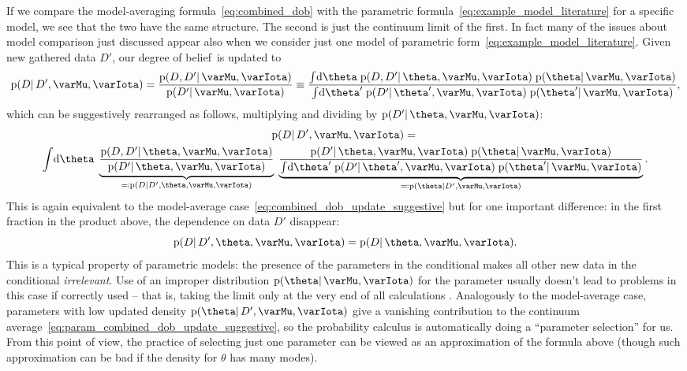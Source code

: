 \documentclass[\ifafour a4paper,12pt,\else a5paper,10pt,\fi%
onecolumn,oneside,article,%
british%
]{memoir}
\theoremstyle{remark}
\theoremstyle{innote}
\newcommand*{\citep}{\parencites}
\newcommand*{\di}{\mathrm{d}}%
\newcommand*{\defs}{\eqqcolon}
\newcommand*{\pf}{\mathrm{p}}%
\renewcommand*{\|}{\mathpunct{|}}
\newcommand*{\chap}{ch.}%
\newcommand*{\dob}{degree of belief}
\newcommand*{\yM}{\varMu}
\newcommand*{\yI}{\varIota}
\newcommand*{\yD}{D}
\newcommand*{\yHm}{\yM}
\begin{document}
If we compare the model-averaging formula~\eqref{eq:combined_dob} with the
parametric formula~\eqref{eq:example_model_literature} for a specific
model, we see that the two have the same structure. The second is just the
continuum limit of the first. In fact many of the issues about model
comparison just discussed appear also when we consider just one model of
parametric form~\eqref{eq:example_model_literature}. Given new gathered
data $\yD'$, our \dob\ is updated to
\begin{equation}
  \label{eq:param_combined_dob_update}
  \pf(\yD \|\yD', \yHm, \yI) =
  \frac{\pf(\yD, \yD'\| \yHm, \yI)}{\pf(\yD' \| \yHm, \yI)} \equiv
  \frac{\int\!\di\theta\; \pf(\yD, \yD' \| \theta, \yHm,\yI)\;
    \pf(\theta \| \yHm, \yI)
  }{
    \int\!\di\theta'\; \pf(\yD' \| \theta',\yHm,\yI)\; \pf(\theta' \|\yHm, \yI)},
\end{equation}
which can be suggestively rearranged as follows, multiplying and
dividing by $\pf(\yD' \|\theta, \yHm, \yI)$:
\begin{multline}
  \label{eq:param_combined_dob_update_suggestive}
  \pf(\yD \|\yD', \yHm, \yI) ={}\\
  \int\!\di\theta\;
  \underbrace{\frac{\pf(\yD, \yD' \|\theta, \yHm,\yI)
    }{
      \pf(\yD' \| \theta, \yHm,\yI)}}_{{}\defs\pf(\yD \| \yD',\theta, \yHm,\yI)}\;
  \underbrace{\frac{
  \pf(\yD' \| \theta, \yHm, \yI)\; \pf(\theta \|\yHm, \yI)
  }{
  \int\!\di\theta'\; \pf(\yD' \| \theta', \yHm, \yI)\; \pf(\theta' \|\yHm, \yI)
  }}_{{}\defs\pf(\theta\|\yD', \yHm, \yI)}.
\end{multline}
This is again equivalent to the model-average
case~\eqref{eq:combined_dob_update_suggestive} but for one important
difference: in the first fraction in the product above, the dependence on
data $\yD'$ disappear:
\begin{equation}
  \label{eq:disappearance_data_given_param}
  \pf(\yD \| \yD',\theta, \yHm,\yI) =
  \pf(\yD \| \theta, \yHm,\yI).
\end{equation}
This is a typical property of parametric models: the presence of the
parameters in the conditional makes all other new data in the conditional
\emph{irrelevant}. Use of an improper distribution
$\pf(\theta \|\yHm, \yI)$ for the parameter usually doesn't lead to
problems in this case if correctly used -- that is, taking the limit only
at the very end of all calculations \citep[\chap~15]{jaynes1994_r2003}.
Analogously to the model-average case, parameters with low updated density
$\pf(\theta \|\yD', \yHm, \yI)$ give a vanishing contribution to the
continuum average~\eqref{eq:param_combined_dob_update_suggestive}, so the
probability calculus is automatically doing a \enquote{parameter selection}
for us. From this point of view, the practice of selecting just one
parameter can be viewed as an approximation of the formula above (though
such approximation can be bad if the density for $\theta$ has many modes).
\end{document}
